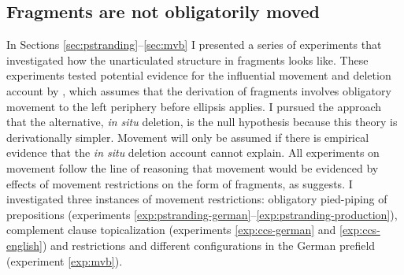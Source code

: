 \subsection{Fragments are not obligatorily moved}
In Sections \ref{sec:pstranding}--\ref{sec:mvb} I presented a series of experiments that investigated how the unarticulated structure in fragments looks like. These experiments tested potential evidence for the influential movement and deletion account by \citet{merchant2004}, which assumes that the derivation of fragments involves obligatory movement to the left periphery before ellipsis applies. I pursued the approach that the alternative, \textit{in situ} deletion, is the null hypothesis because this theory is derivationally simpler. Movement will only be assumed if there is empirical evidence that the \textit{in situ} deletion account cannot explain. All experiments on movement follow the line of reasoning that movement would be evidenced by effects of movement restrictions on the form of fragments, as \citet{merchant2004} suggests. I investigated three instances of movement restrictions: obligatory pied-piping of prepositions (experiments \ref{exp:pstranding-german}--\ref{exp:pstranding-production}), complement clause topicalization (experiments \ref{exp:ccs-german} and \ref{exp:ccs-english}) and restrictions and different configurations in the German prefield (experiment \ref{exp:mvb}).

